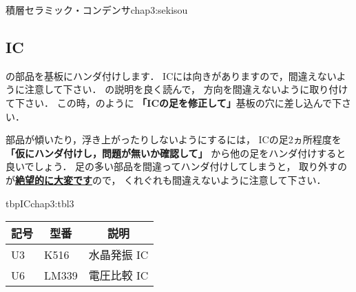 {積層セラミック・コンデンサ}{chap3:sekisou}

%
%

\subsection{IC}
の部品を基板にハンダ付けします．
ICには向きがありますので，間違えないように注意して下さい．
の説明を良く読んで，
方向を間違えないように取り付けて下さい．
この時，のように
{\bf 「ICの足を修正して」}基板の穴に差し込んで下さい．

部品が傾いたり，浮き上がったりしないようにするには，
ICの足2ヵ所程度を{\bf 「仮にハンダ付けし，問題が無いか確認して」}
から他の足をハンダ付けすると良いでしょう．
足の多い部品を間違ってハンダ付けしてしまうと，
取り外すのが\underline{\bf 絶望的に大変です}ので，
くれぐれも間違えないように注意して下さい．

\begin{mytable}{tbp}{IC}{chap3:tbl3}
{\small\begin{tabular}{l|l|l}
\hline
\hline
\multicolumn{1}{c|}{記号} &
\multicolumn{1}{c|}{型番} &
\multicolumn{1}{c}{説明} \\
\hline
U3 & K516       & 水晶発振 IC \\
U6 & LM339      & 電圧比較 IC \\
\end{tabular}}
\end{mytable}



